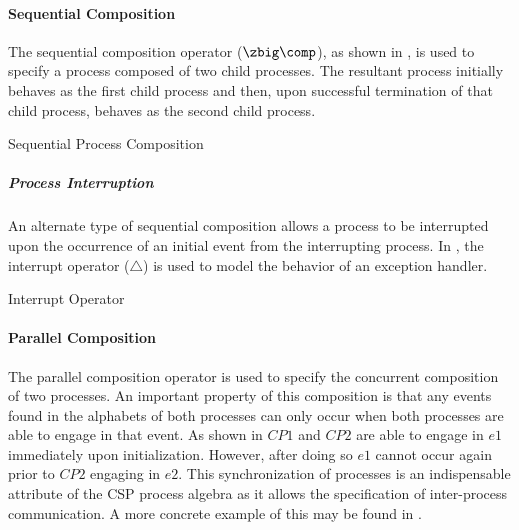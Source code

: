 \documentclass[letterpaper,10pt,draft]{book}
\begin{document}
\paragraph{Sequential Composition}
   \label{sect:SeqComp}

The sequential composition operator ($\mathrel{\zbig\comp}$), as shown in ,
is used to specify a process composed of two child processes.  The resultant process
initially behaves as the first child process and then, upon successful termination
of that child process, behaves as the second child process.

\begin{example}
\begin{minipage}[t]{0.49\linewidth}
   
\end{minipage}
\begin{minipage}[t]{0.49\linewidth}
   \azbox
   
\end{minipage}

   \caption{Sequential Process Composition}
   \label{ex:SeqComp}
\end{example}

\subparagraph{Process Interruption}
   \label{sect:Interrupt}

An alternate type of sequential composition allows a process to be interrupted upon
the occurrence of an initial event from the interrupting process.  In ,
the interrupt operator ($\triangle$) is used to model the behavior of an exception
handler.

\begin{example}
\begin{minipage}[t]{0.49\linewidth}
   
\end{minipage}
\begin{minipage}[t]{0.49\linewidth}
   \azbox
   
\end{minipage}

   \caption{Interrupt Operator}
   \label{ex:Interrupt}
\end{example}

\paragraph{Parallel Composition}
   \label{sect:ParComp}

The parallel composition operator is used to specify the concurrent composition
of two processes.  An important property of this composition is that any events
found in the alphabets of both processes can only occur when both processes are
able to engage in that event.  As shown in  $CP1$ and $CP2$ are
able to engage in $e1$ immediately upon initialization.  However, after doing so
$e1$ cannot occur again prior to $CP2$ engaging in $e2$.  This synchronization of
processes is an indispensable attribute of the CSP process algebra as it allows
the specification of inter-process communication.  A more concrete example of this
may be found in .
\end{document}
